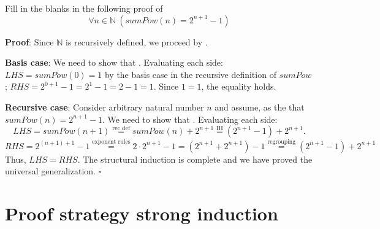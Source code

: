 \documentclass[12pt, oneside]{article}
\begin{document}
Fill in the blanks in the following proof of 
\[
    \forall n \in \mathbb{N}~(sumPow(n) = 2^{n+1} - 1)
\]

{\bf Proof}: Since $\mathbb{N}$ is recursively defined, we proceed by \underline{}.

{\bf Basis case}: We need to show that \underline{}.
Evaluating each side: $LHS = sumPow(0) = 1$ by the basis case in the recursive definition
of $sumPow$; $RHS = 2^{0+1} - 1 = 2^1 - 1 = 2-1 = 1$. Since $1=1$, the equality holds.

{\bf Recursive case}: Consider arbitrary natural number $n$ and assume, as the 
\underline{\phantom{Induction Hypothesis (IH)}} that $sumPow(n) = 2^{n+1} - 1$. We need to show that
\underline{}.  Evaluating each side: 
\[
LHS = sumPow(n+1) \overset{\text{rec def}}{=} sumPow(n)  + 2^{n+1}\overset{\text{IH}}{=} (2^{n+1} - 1) + 2^{n+1}.
\]
\[
RHS = 2^{(n+1)+1}- 1 \overset{\text{exponent rules}}{=} 2 \cdot 2^{n+1} -1  = \left(2^{n+1} + 2^{n+1} \right) - 1
\overset{\text{regrouping}}{=}  (2^{n+1} - 1) + 2^{n+1} 
\]
Thus, $LHS = RHS$. The structural induction is complete and we have proved the universal generalization.
$\square$

 \vfill
\section*{Proof strategy strong induction}


 \vfill
\end{document}
